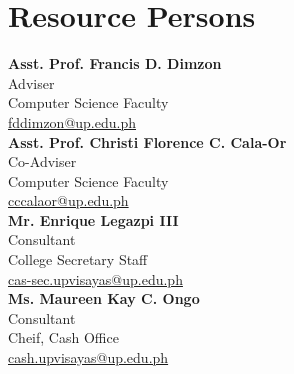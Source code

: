 %
%
%                 

\chapter{Resource Persons}
\label{sec:appendixb}

%
%
%
%

%
%

\newcommand{\resperson}[4]{\textbf{#1} \\ #2 \\ #3 \\ \url{#4}\vspace{0.5em}\\}

\resperson{Asst. Prof. Francis D. Dimzon}{Adviser}{Computer Science Faculty}{fddimzon@up.edu.ph}

\resperson{Asst. Prof. Christi Florence C. Cala-Or}{Co-Adviser}{Computer Science Faculty}{cccalaor@up.edu.ph}

\newpage
\resperson{Mr. Enrique Legazpi III}{Consultant}{College Secretary Staff}{cas-sec.upvisayas@up.edu.ph}

\resperson{Ms. Maureen Kay C. Ongo}{Consultant}{Cheif, Cash Office}{cash.upvisayas@up.edu.ph}